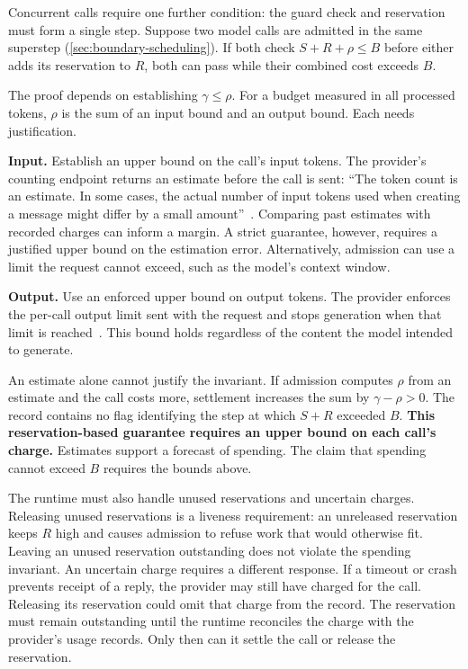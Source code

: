 \ei

Concurrent calls require one further condition: the guard check and reservation must form a
single step. Suppose two model calls are admitted in the same superstep
(\cref{sec:boundary-scheduling}). If both check $S + R + \rho \leq B$ before either adds its
reservation to $R$, both can pass while their combined cost exceeds $B$.

The proof depends on establishing $\gamma \leq \rho$. For a budget measured in all processed
tokens, $\rho$ is the sum of an input bound and an output bound. Each needs justification.

\bi

\item \textbf{Input.} Establish an upper bound on the call's input tokens. The provider's counting
endpoint returns an estimate before the call is sent: ``The token
count is an estimate. In some cases, the actual number of input tokens used when creating a message
might differ by a small amount''~\citep{anthropic-token-counting}. Comparing past estimates with
recorded charges can inform a margin. A strict guarantee, however, requires a justified upper
bound on the estimation error. Alternatively, admission can use a limit the request cannot exceed,
such as the model's context window.

\item \textbf{Output.} Use an enforced upper bound on output tokens. The provider enforces the
per-call output limit sent with the request and stops generation when that limit is
reached~\citep{anthropic-stop-reasons}. This bound holds regardless of the content the model
intended to generate.

\ei

An estimate alone cannot justify the invariant. If admission computes $\rho$ from an estimate and
the call costs more, settlement increases the sum by $\gamma - \rho > 0$. The record contains no
flag identifying the step at which $S + R$ exceeded $B$. \textbf{This reservation-based guarantee
requires an upper bound on each call's charge.} Estimates support a forecast of spending. The
claim that spending cannot exceed $B$ requires the bounds above.

The runtime must also handle unused reservations and uncertain charges. Releasing unused
reservations is a liveness requirement: an unreleased reservation keeps $R$ high and causes
admission to refuse work that would otherwise fit. Leaving an unused reservation outstanding
does not violate the spending invariant. An uncertain charge requires a different response.
If a timeout or crash prevents receipt of a reply, the provider may
still have charged for the call. Releasing its reservation could omit that charge from the record.
The reservation must remain outstanding until the runtime reconciles the charge with the
provider's usage records. Only then can it settle the call or release the reservation.

